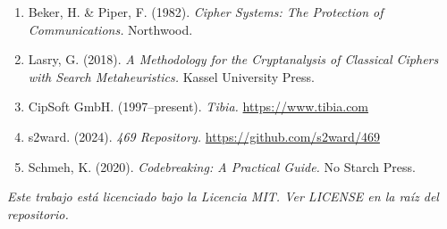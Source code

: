 \documentclass[11pt,a4paper]{article}
\begin{document}
\begin{enumerate}
\item Beker, H. \& Piper, F. (1982). \textit{Cipher Systems: The Protection of Communications.} Northwood.
\item Lasry, G. (2018). \textit{A Methodology for the Cryptanalysis of Classical Ciphers with Search Metaheuristics.} Kassel University Press.
\item CipSoft GmbH. (1997–present). \textit{Tibia.} \url{https://www.tibia.com}
\item s2ward. (2024). \textit{469 Repository.} \url{https://github.com/s2ward/469}
\item Schmeh, K. (2020). \textit{Codebreaking: A Practical Guide.} No Starch Press.
\end{enumerate}

\vfill
\begin{center}
\textit{Este trabajo está licenciado bajo la Licencia MIT. Ver LICENSE en la ra\'{i}z del repositorio.}
\end{center}
\end{document}
